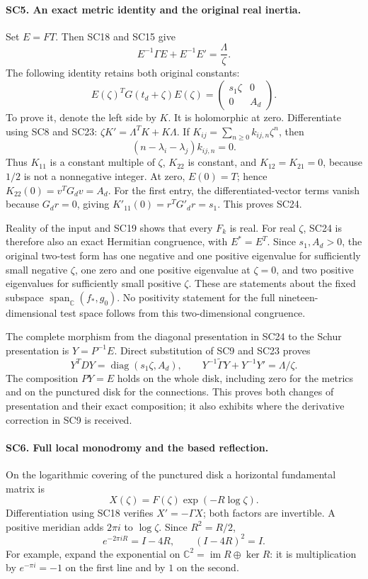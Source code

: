 \documentclass[11pt,a4paper]{article}
\theoremstyle{definition}\newtheorem{definition}[theorem]{Definition}
\begin{document}
\paragraph{SC5. An exact metric identity and the original real inertia.}
Set \(E=FT\). Then SC18 and SC15 give
\[
 E^{-1}\Gamma E+E^{-1}E'=\frac{\Lambda}{\zeta}.
 \tag{SC23}
\]
The following identity retains both original constants:
\[
 E(\zeta)^T G(t_d+\zeta)E(\zeta)
   =\begin{pmatrix}s_1\zeta&0\\0&A_d\end{pmatrix}.
 \tag{SC24}
\]
To prove it, denote the left side by \(K\).
It is holomorphic at zero. Differentiate using SC8 and SC23:
\(\zeta K'=\Lambda^TK+K\Lambda\).
If \(K_{ij}=\sum_{n\ge0}k_{ij,n}\zeta^n\), then
\[
 (n-\lambda_i-\lambda_j)k_{ij,n}=0.
\]
Thus \(K_{11}\) is a constant multiple of \(\zeta\),
\(K_{22}\) is constant, and \(K_{12}=K_{21}=0\), because
\(1/2\) is not a nonnegative integer. At zero,
\(E(0)=T\); hence \(K_{22}(0)=v^TG_dv=A_d\).
For the first entry, the differentiated-vector terms vanish
because \(G_dr=0\), giving \(K'_{11}(0)=r^TG'_dr=s_1\).
This proves SC24.

Reality of the input and SC19 shows that every \(F_k\) is real.
For real \(\zeta\), SC24 is therefore also an exact Hermitian
congruence, with \(E^*=E^T\). Since \(s_1,A_d>0\), the
original two-test form has one negative and one positive
eigenvalue for sufficiently small negative \(\zeta\), one
zero and one positive eigenvalue at \(\zeta=0\), and two
positive eigenvalues for sufficiently small positive \(\zeta\).
These are statements about the fixed subspace
\(\operatorname{span}_{\mathbb C}(f_*,g_0)\). No positivity
statement for the full nineteen-dimensional test space follows
from this two-dimensional congruence.

The complete morphism from the diagonal presentation in SC24
to the Schur presentation is \(Y=P^{-1}E\). Direct substitution
of SC9 and SC23 proves
\[
 Y^TDY=\operatorname{diag}(s_1\zeta,A_d),\qquad
 Y^{-1}\widetilde\Gamma Y+Y^{-1}Y'=\Lambda/\zeta.
 \tag{SC25}
\]
The composition \(PY=E\) holds on the whole disk, including zero
for the metrics and on the punctured disk for the connections.
This proves both changes of presentation and their exact
composition; it also exhibits where the derivative correction
in SC9 is received.

\paragraph{SC6. Full local monodromy and the based reflection.}
On the logarithmic covering of the punctured disk a horizontal
fundamental matrix is
\[
 X(\zeta)=F(\zeta)\exp(-R\log\zeta).
 \tag{SC26}
\]
Differentiation using SC18 verifies \(X'=-\Gamma X\);
both factors are invertible. A positive meridian adds \(2\pi i\)
to \(\log\zeta\). Since \(R^2=R/2\),
\[
 e^{-2\pi iR}=I-4R,\qquad (I-4R)^2=I.
 \tag{SC27}
\]
For example, expand the exponential on
\(\mathbb C^2=\operatorname{im}R\oplus\ker R\):
it is multiplication by \(e^{-\pi i}=-1\) on the first
line and by \(1\) on the second.
\end{document}
